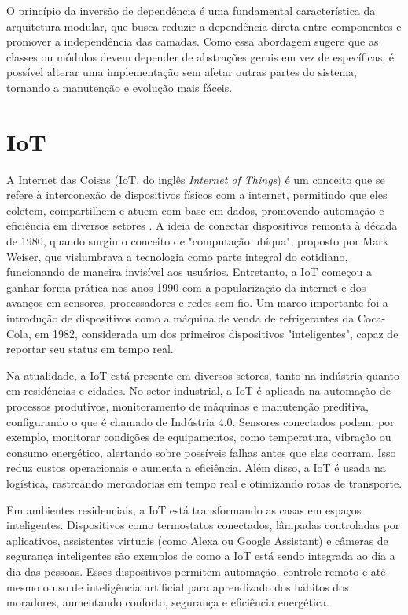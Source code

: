 O princípio da inversão de dependência é uma fundamental característica da arquitetura modular, que busca reduzir a dependência direta entre componentes e promover a independência das camadas. Como essa abordagem sugere que as classes ou módulos devem depender de abstrações gerais em vez de específicas, é possível alterar uma implementação sem afetar outras partes do sistema, tornando a manutenção e evolução mais fáceis.

\section{IoT}

A Internet das Coisas (IoT, do inglês \textit{Internet of Things}) é um conceito que se refere à interconexão de dispositivos físicos com a internet, permitindo que eles coletem, compartilhem e atuem com base em dados, promovendo automação e eficiência em diversos setores \cite{gokhale2018introduction}. A ideia de conectar dispositivos remonta à década de 1980, quando surgiu o conceito de "computação ubíqua", proposto por Mark Weiser, que vislumbrava a tecnologia como parte integral do cotidiano, funcionando de maneira invisível aos usuários. Entretanto, a IoT começou a ganhar forma prática nos anos 1990 com a popularização da internet e dos avanços em sensores, processadores e redes sem fio. Um marco importante foi a introdução de dispositivos como a máquina de venda de refrigerantes da Coca-Cola, em 1982, considerada um dos primeiros dispositivos "inteligentes", capaz de reportar seu status em tempo real.

Na atualidade, a IoT está presente em diversos setores, tanto na indústria quanto em residências e cidades. No setor industrial, a IoT é aplicada na automação de processos produtivos, monitoramento de máquinas e manutenção preditiva, configurando o que é chamado de Indústria 4.0. Sensores conectados podem, por exemplo, monitorar condições de equipamentos, como temperatura, vibração ou consumo energético, alertando sobre possíveis falhas antes que elas ocorram. Isso reduz custos operacionais e aumenta a eficiência. Além disso, a IoT é usada na logística, rastreando mercadorias em tempo real e otimizando rotas de transporte.

Em ambientes residenciais, a IoT está transformando as casas em espaços inteligentes. Dispositivos como termostatos conectados, lâmpadas controladas por aplicativos, assistentes virtuais (como Alexa ou Google Assistant) e câmeras de segurança inteligentes são exemplos de como a IoT está sendo integrada ao dia a dia das pessoas. Esses dispositivos permitem automação, controle remoto e até mesmo o uso de inteligência artificial para aprendizado dos hábitos dos moradores, aumentando conforto, segurança e eficiência energética.

